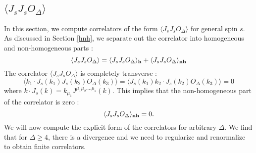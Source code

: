 \documentclass[a4paper,11pt]{article}
\begin{document}
\subsection{$\langle J_s J_s O_{\Delta}\rangle$}
In this section, we compute correlators of the form $\langle J_s J_s O_{\Delta}\rangle$ for general spin $s$. As discussed in Section \ref{hnh}, we separate out the correlator into homogeneous and non-homogeneous parts :
\begin{equation}
  \langle J_s J_s O_{\Delta}\rangle = \langle J_s J_s O_{\Delta}\rangle_{{\bf{h}}}+ \langle J_s J_s O_{\Delta}\rangle_{{\bf{nh}}}  
\end{equation}
 The correlator $\langle J_s J_s O_{\Delta}\rangle$ is completely transverse :
\begin{equation}\label{Wtjsjso}
    \langle {k_1}\cdot J_s(k_1) J_s(k_2) O_{\Delta}(k_3) \rangle = \langle J_s(k_1) {k_2}\cdot J_s(k_2)  O_{\Delta}(k_3) \rangle=0
\end{equation}
where $k\cdot J_s(k)=k_{\mu_1} J^{\mu_1 \mu_2 ....\mu_s}(k).$ 
This implies that the non-homogeneous part of the correlator is zero :
\begin{equation}
  \langle J_s J_s O_{\Delta}\rangle_{{\bf{nh}}}  =0.  
\end{equation}
We will now compute the explicit form of the correlators for arbitrary $\Delta$. We find that for $\Delta \ge 4$, there is a divergence and we need to regularize and renormalize to obtain finite correlators.
\end{document}
